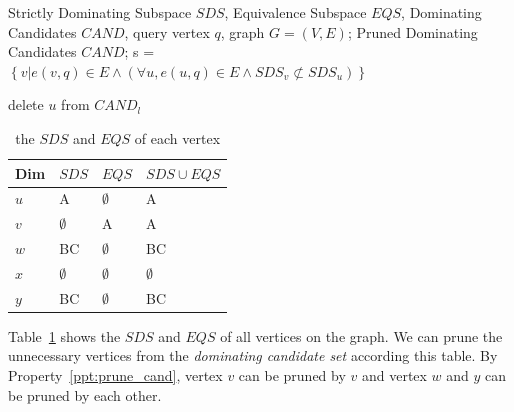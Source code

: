 \begin{algorithm}[H]
  \caption{1-hop Pruning}
  \label{algo:pruning_graph}
  \begin{algorithmic}[1]
  \show\LOOP
    \REQUIRE Strictly Dominating Subspace $\mathit{SDS}$, Equivalence Subspace $\mathit{EQS}$, Dominating Candidates $\mathit{CAND}$, query vertex $q$, graph $G=(V, E)$;
    \ENSURE Pruned Dominating Candidates $\mathit{CAND}$;
    \STATE s = $\left\{v|e(v, q) \in E \wedge (\forall u, e(u, q) \in E \wedge SDS_v \not\subset SDS_u)\right\}$
    
                    \STATE delete $u$ from $\mathit{CAND}_l$
                \ENDIF
                
            \ENDFOR
        \ENDFOR
    \ENDFOR
  \end{algorithmic}
\end{algorithm}

\begin{table}[h]
    \centering
    \begin{tabular}{|l|l|l|l|}
    \hline
    Dim & $SDS$       & $EQS$       & $SDS \cup EQS$ \\ \hline
    $u$ & A           & $\emptyset$ & A              \\ \hline
    $v$ & $\emptyset$ & A           & A              \\ \hline
    $w$ & BC          & $\emptyset$ & BC             \\ \hline
    $x$ & $\emptyset$ & $\emptyset$ & $\emptyset$    \\ \hline
    $y$ & BC          & $\emptyset$ & BC             \\ \hline
    \end{tabular}
    \caption{\label{font-table} the $SDS$ and $EQS$ of each vertex}
    \label{tab:SDS_EQS}
\end{table}

Table~\ref{tab:SDS_EQS} shows the $SDS$ and $EQS$ of all vertices on the graph. We can prune the unnecessary vertices from the \emph{dominating candidate set} according this table. By Property~\ref{ppt:prune_cand}, vertex $v$ can be pruned by $v$ and vertex $w$ and $y$ can be pruned by each other.

